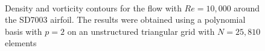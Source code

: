 \begin{figure}[htbp]
\centering
{}
\\

\caption{Density and vorticity contours for the flow with $Re = 10,000$ around the SD7003 airfoil. The results were obtained using a polynomial basis with $p=2$ on an unstructured triangular grid with $N = 25,810$ elements}
\label{sdairfoilre10k}
\end{figure}

